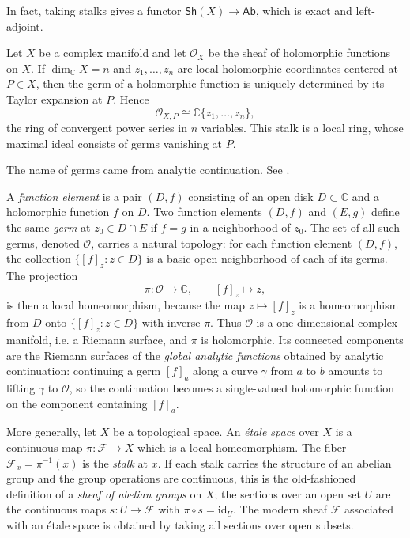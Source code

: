 \documentclass[11pt]{article}
\begin{document}
In fact, taking stalks gives a functor $ \mathsf{Sh}(X) \to \mathsf{Ab}$, 
which is exact and left-adjoint. 

\begin{example}
    Let $X$ be a complex manifold and let $\mathscr{O}_{X}$ 
    be the sheaf of holomorphic functions on $X$. 
    If $\dim_{\mathbb{C}} X = n$ and $z_1,\dots,z_n$ are local 
    holomorphic coordinates centered at $P \in X$, then the germ of a 
    holomorphic function is uniquely determined by its Taylor 
    expansion at $P$. Hence
    $$\mathscr{O}_{X,P} \cong \mathbb{C}\{z_1,\dots,z_n\},$$
    the ring of convergent power series in $n$ variables. 
    This stalk is a local ring, whose maximal ideal consists of 
    germs vanishing at $P$.
\end{example}

\begin{example}
    The name of germs came from analytic continuation. 
    See \cite[Chapter 8]{ahlfors}.
    
    A \emph{function element} is a pair $(D,f)$ consisting of an open
    disk $D \subset \mathbb{C}$ and a holomorphic function $f$ on $D$.
    Two function elements $(D,f)$ and $(E,g)$ define the same
    \emph{germ} at $z_0 \in D \cap E$ if $f = g$ in a neighborhood of $z_0$.
    The set of all such germs, denoted $\mathcal{O}$, carries a natural
    topology: for each function element $(D,f)$, the collection
    $\{[f]_z : z \in D\}$ is a basic open neighborhood of each of its
    germs. The projection
    $$\pi:\mathcal{O}\to\mathbb{C}, \qquad [f]_z \mapsto z,$$
    is then a local homeomorphism, because the map
    $z \mapsto [f]_z$ is a homeomorphism from $D$ onto
    $\{[f]_z : z \in D\}$ with inverse $\pi$.
    Thus $\mathcal{O}$ is a one-dimensional complex manifold, i.e. a
    Riemann surface, and $\pi$ is holomorphic.
    Its connected components are the Riemann surfaces of the
    \emph{global analytic functions} obtained by analytic continuation:
    continuing a germ $[f]_a$ along a curve $\gamma$ from $a$ to $b$
    amounts to lifting $\gamma$ to $\mathcal{O}$, so the continuation
    becomes a single-valued holomorphic function on the component
    containing $[f]_a$.
\end{example}

\begin{example}
    More generally, let $X$ be a topological space. An
    \emph{\'etale space} over $X$ is a continuous map
    $\pi:\mathcal{F}\to X$ which is a local homeomorphism.
    The fiber $\mathcal{F}_x = \pi^{-1}(x)$ is the \emph{stalk} at $x$.
    If each stalk carries the structure of an abelian group and the
    group operations are continuous, this is the old-fashioned
    definition of a \emph{sheaf of abelian groups} on $X$; the
    sections over an open set $U$ are the continuous maps
    $s:U\to \mathcal{F}$ with $\pi \circ s = \mathrm{id}_U$.
    The modern sheaf $\mathscr{F}$ associated with an \'etale space
    is obtained by taking all sections over open subsets.
\end{example}
\end{document}
